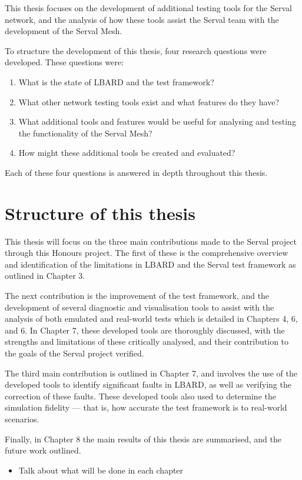 This thesis focuses on the development of additional testing tools for the Serval network, and the analysis of how these tools assist the Serval team with the development of the Serval Mesh.


To structure the development of this thesis, four research questions were developed.
These questions were:
\begin{enumerate}
    \item What is the state of LBARD and the test framework?
    \item What other network testing tools exist and what features do they have?
    \item What additional tools and features would be useful for analysing and testing the functionality of the Serval Mesh?
    \item How might these additional tools be created and evaluated?
\end{enumerate}
Each of these four questions is answered in depth throughout this thesis.


\section{Structure of this thesis}

This thesis will focus on the three main contributions made to the Serval project through this Honours project.
The first of these is the comprehensive overview and identification of the limitations in LBARD and the Serval test framework as outlined in Chapter 3.

The next contribution is the improvement of the test framework, and the development of several diagnostic and visualisation tools to assist with the analysis of both emulated and real-world tests which is detailed in Chapters 4, 6, and 6. 
In Chapter 7, these developed tools are thoroughly discussed, with the strengths and limitations of these critically analysed, and their contribution to the goals of the Serval project verified. 

The third main contribution is outlined in Chapter 7, and involves the use of the developed tools to identify significant faults in LBARD, as well as verifying the correction of these faults.
These developed tools also used to determine the simulation fidelity — that is, how accurate the test framework is to real-world scenarios.

Finally, in Chapter 8 the main results of this thesis are summarised, and the future work outlined.


\begin{itemize}
    \item   Talk about what will be done in each chapter
\end{itemize}

